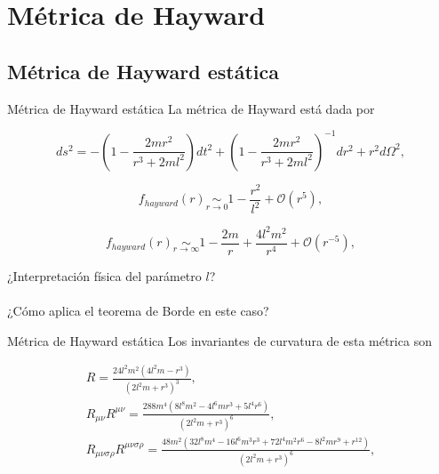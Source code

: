 \documentclass[t]{beamer}
\numberwithin{equation}{section}
\begin{document}
\section{\label{planck stars section} Métrica de Hayward}


\subsection{Métrica de Hayward estática}

\begin{frame}{Métrica de Hayward estática}
La métrica de Hayward está dada por

\begin{equation}
\label{hayward metric}
ds^2 = -\left( 1 - \frac{2mr^2}{r^3 + 2ml^2} \right) dt^2 + \left( 1 - \frac{2mr^2}{r^3 + 2ml^2} \right)^{-1} dr^2 + r^2d\Omega ^2,
\end{equation}

\begin{equation}
f_{hayward}(r) \underset{r \to 0}{\sim} 1 - \frac{r^2}{l^2} + \mathcal{O}(r^5),
\end{equation}

\begin{equation}
f_{hayward}(r) \underset{r \to \infty}{\sim} 1 - \frac{2m}{r} + \frac{4l^2m^2}{r^4} + \mathcal{O}(r^{-5}),
\end{equation}

¿Interpretación física del parámetro $l$?
\
\\
\
\\
¿Cómo aplica el teorema de Borde en este caso?
\end{frame}

\begin{frame}{Métrica de Hayward estática}
\vspace{\fill}
Los invariantes de curvatura de esta métrica son

\begin{equation}
\label{hayward scalars}
\begin{gathered}
R = \frac{24 l^2 m^2 \left(4 l^2 m-r^3\right)}{\left(2 l^2 m+r^3\right)^3},\\
R_{\mu \nu}R^{\mu \nu} = \frac{288 m^4 \left(8 l^8 m^2-4 l^6 m r^3+5 l^4 r^6\right)}{\left(2 l^2 m+r^3\right)^6},\\
R_{\mu \nu \sigma \rho}R^{\mu \nu \sigma \rho} = \frac{48 m^2 \left(32 l^8 m^4-16 l^6 m^3 r^3+72 l^4 m^2 r^6-8 l^2 m r^9+r^{12}\right)}{\left(2 l^2 m+r^3\right)^6},
\end{gathered}
\end{equation}
\end{frame}
\end{document}
